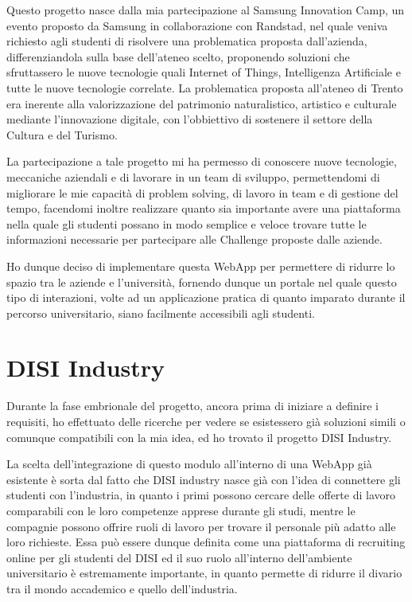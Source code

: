 Questo progetto nasce dalla mia partecipazione al Samsung Innovation Camp, un evento proposto da Samsung in collaborazione con Randstad, nel quale veniva richiesto agli studenti di risolvere una problematica proposta dall'azienda, differenziandola sulla base dell'ateneo scelto, proponendo soluzioni che sfruttassero le nuove tecnologie quali Internet of Things, Intelligenza Artificiale e tutte le nuove tecnologie correlate. La problematica proposta all'ateneo di Trento era inerente alla valorizzazione del patrimonio naturalistico, artistico e culturale mediante l'innovazione digitale, con l'obbiettivo di sostenere il settore della Cultura e del Turismo.

La partecipazione a tale progetto mi ha permesso di conoscere nuove tecnologie, meccaniche aziendali e di lavorare in un team di sviluppo, permettendomi di migliorare le mie capacità di problem solving, di lavoro in team e di gestione del tempo, facendomi inoltre realizzare quanto sia importante avere una piattaforma nella quale gli studenti possano in modo semplice e veloce trovare tutte le informazioni necessarie per partecipare alle Challenge proposte dalle aziende.

Ho dunque deciso di implementare questa WebApp per permettere di ridurre lo spazio tra le aziende e l'università, fornendo dunque un portale nel quale questo tipo di interazioni, volte ad un applicazione pratica di quanto imparato durante il percorso universitario, siano facilmente accessibili agli studenti.



\section{DISI Industry}
\label{sec:context}
Durante la fase embrionale del progetto, ancora prima di iniziare a definire i requisiti, ho effettuato delle ricerche per vedere se esistessero già soluzioni simili o comunque compatibili con la mia idea, ed ho trovato il progetto DISI Industry.


La scelta dell'integrazione di questo modulo all'interno di una WebApp già esistente è sorta dal fatto che DISI industry nasce già con l'idea di connettere gli studenti con l'industria, in quanto i primi possono cercare delle offerte di lavoro comparabili con le loro competenze apprese durante gli studi, mentre le compagnie possono offrire ruoli di lavoro per trovare il personale più adatto alle loro richieste. Essa può essere dunque definita come una piattaforma di recruiting online per gli studenti del DISI ed il suo ruolo all'interno dell'ambiente universitario è estremamente importante, in quanto permette di ridurre il divario tra il mondo accademico e quello dell'industria. \cite{industry}

